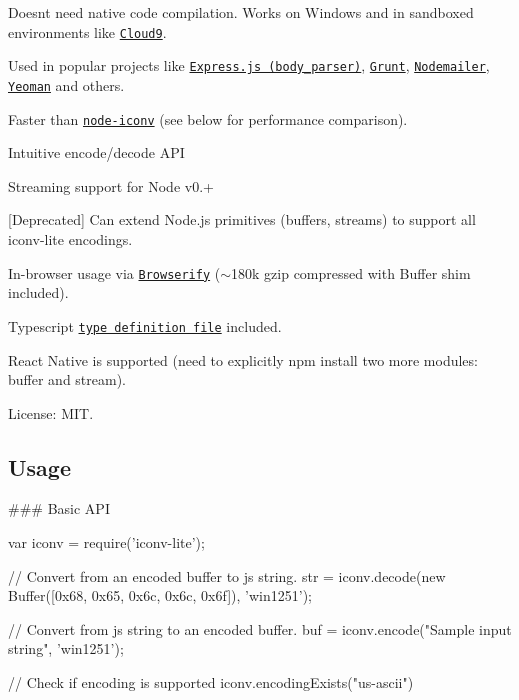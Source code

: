 
\begin{DoxyItemize}
\item Doesn\textquotesingle{}t need native code compilation. Works on Windows and in sandboxed environments like \href{http://c9.io}{\tt Cloud9}.
\item Used in popular projects like \href{https://github.com/expressjs/body-parser}{\tt Express.\+js (body\+\_\+parser)}, \href{http://gruntjs.com/}{\tt Grunt}, \href{http://www.nodemailer.com/}{\tt Nodemailer}, \href{http://yeoman.io/}{\tt Yeoman} and others.
\item Faster than \href{https://github.com/bnoordhuis/node-iconv}{\tt node-\/iconv} (see below for performance comparison).
\item Intuitive encode/decode A\+PI
\item Streaming support for Node v0.+
\item \mbox{[}Deprecated\mbox{]} Can extend Node.\+js primitives (buffers, streams) to support all iconv-\/lite encodings.
\item In-\/browser usage via \href{https://github.com/substack/node-browserify}{\tt Browserify} ($\sim$180k gzip compressed with Buffer shim included).
\item Typescript \href{https://github.com/ashtuchkin/iconv-lite/blob/master/lib/index.d.ts}{\tt type definition file} included.
\item React Native is supported (need to explicitly {\ttfamily npm install} two more modules\+: {\ttfamily buffer} and {\ttfamily stream}).
\item License\+: M\+IT.
\end{DoxyItemize}

\href{https://npmjs.org/packages/iconv-lite/}{\tt }

\subsection*{Usage}

\#\#\# Basic A\+PI 
\begin{DoxyCode}
var iconv = require('iconv-lite');

// Convert from an encoded buffer to js string.
str = iconv.decode(new Buffer([0x68, 0x65, 0x6c, 0x6c, 0x6f]), 'win1251');

// Convert from js string to an encoded buffer.
buf = iconv.encode("Sample input string", 'win1251');

// Check if encoding is supported
iconv.encodingExists("us-ascii")
\end{DoxyCode}


